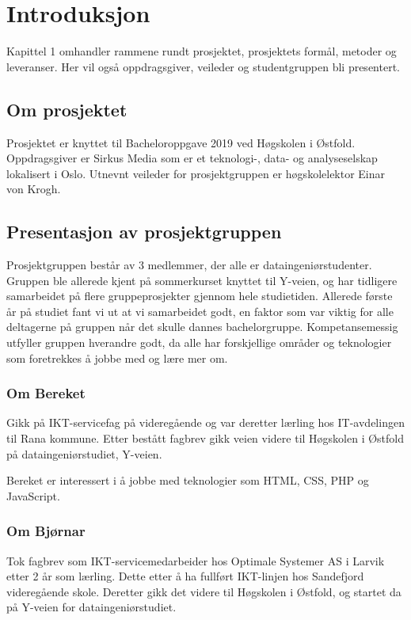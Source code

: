 \cleardoublepage
\chapter{Introduksjon}
\label{chap:intro}
Kapittel 1 omhandler rammene rundt prosjektet, prosjektets formål, metoder og leveranser. Her vil også oppdragsgiver, veileder og studentgruppen bli presentert. 

\section{Om prosjektet}
Prosjektet er knyttet til Bacheloroppgave 2019 ved Høgskolen i Østfold. Oppdragsgiver er Sirkus Media som er et teknologi-, data- og analyseselskap lokalisert i Oslo. Utnevnt veileder for prosjektgruppen er høgskolelektor Einar von Krogh.

\section{Presentasjon av prosjektgruppen}

Prosjektgruppen består av 3 medlemmer, der alle er dataingeniørstudenter. Gruppen ble allerede kjent på sommerkurset knyttet til Y-veien, og har tidligere samarbeidet på flere gruppeprosjekter gjennom hele studietiden. Allerede første år på studiet fant vi ut at vi samarbeidet godt, en faktor som var viktig for alle deltagerne på gruppen når det skulle dannes bachelorgruppe. Kompetansemessig utfyller gruppen hverandre godt, da alle har forskjellige områder og teknologier som foretrekkes å jobbe med og lære mer om.  

\subsection{Om Bereket}
Gikk på IKT-servicefag på  videregående og var deretter lærling hos IT-avdelingen til Rana kommune. Etter bestått fagbrev gikk veien videre til Høgskolen i Østfold på dataingeniørstudiet, Y-veien.

Bereket er interessert i å jobbe med teknologier som HTML, CSS, PHP og JavaScript.

\subsection{Om Bjørnar}
Tok fagbrev som IKT-servicemedarbeider hos Optimale Systemer AS i Larvik etter 2 år som lærling. Dette etter å ha fullført IKT-linjen hos Sandefjord videregående skole. Deretter gikk det videre til Høgskolen i Østfold, og startet da på Y-veien for dataingeniørstudiet.

